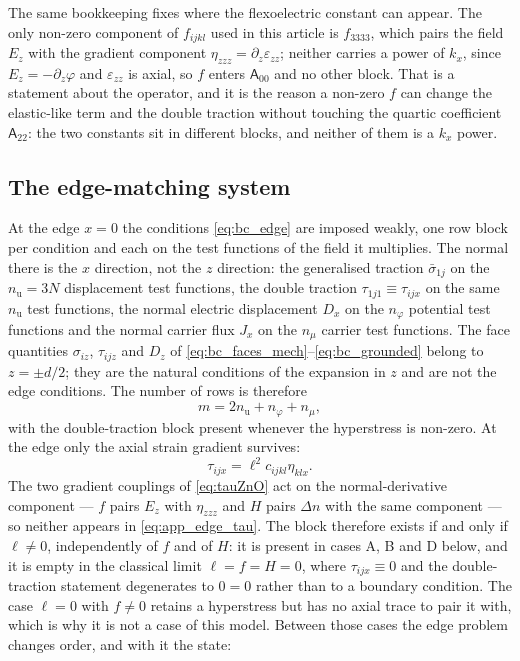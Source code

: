 The same bookkeeping fixes where the flexoelectric constant can appear.  The only
non-zero component of $f_{ijkl}$ used in this article is $f_{3333}$, which pairs
the field $E_z$ with the gradient component $\eta_{zzz}=\partial_z\varepsilon_{zz}$;
neither carries a power of $k_x$, since $E_z=-\partial_z\varphi$ and
$\varepsilon_{zz}$ is axial, so $f$ enters $\mathsf A_{00}$ and no other block.
That is a statement about the operator, and it is the reason a non-zero $f$ can
change the elastic-like term and the double traction without touching the quartic
coefficient $\mathsf A_{22}$: the two constants sit in different blocks, and
neither of them is a $k_x$ power.

\subsection{The edge-matching system}

At the edge $x=0$ the conditions \eqref{eq:bc_edge} are imposed weakly, one row
block per condition and each on the test functions of the field it multiplies.
The normal there is the $x$ direction, not the $z$ direction: the generalised
traction $\bar\sigma_{1j}$ on the $n_{\mathrm u}=3N$ displacement test functions,
the double traction $\tau_{1j1}\equiv\tau_{ijx}$ on the same $n_{\mathrm u}$ test
functions, the normal electric displacement $D_x$ on the $n_\varphi$ potential
test functions and the normal carrier flux $J_x$ on the $n_\mu$ carrier test
functions.  The face quantities $\sigma_{iz}$, $\tau_{ijz}$ and $D_z$ of
\eqref{eq:bc_faces_mech}--\eqref{eq:bc_grounded} belong to $z=\pm d/2$; they are
the natural conditions of the expansion in $z$ and are not the edge conditions.
The number of rows is therefore
\begin{equation}
\label{eq:app_edge_rows}
m=2n_{\mathrm u}+n_\varphi+n_\mu ,
\end{equation}
with the double-traction block present whenever the hyperstress is non-zero.  At
the edge only the axial strain gradient survives:
\begin{equation}
\label{eq:app_edge_tau}
\tau_{ijx}=\ell^{2}c_{ijkl}\eta_{klx} .
\end{equation}
The two gradient couplings of \eqref{eq:tauZnO} act on the normal-derivative
component --- $f$ pairs $E_z$ with $\eta_{zzz}$ and $H$ pairs $\Delta n$ with the
same component --- so neither appears in \eqref{eq:app_edge_tau}.  The block
therefore exists if and only if $\ell\neq0$, independently of $f$ and of $H$: it
is present in cases A, B and D below, and it is empty in the classical limit
$\ell=f=H=0$, where $\tau_{ijx}\equiv0$ and the double-traction statement
degenerates to $0=0$ rather than to a boundary condition.  The case $\ell=0$ with
$f\neq0$ retains a hyperstress but has no axial trace to pair it with, which is
why it is not a case of this model.  Between those cases the edge problem changes
order, and with it the state:

